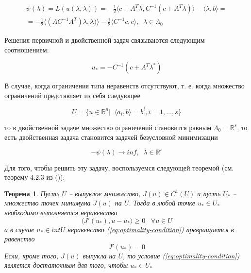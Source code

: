\documentclass[a4paper, 12pt, titlepage]{article}
\theoremstyle{definition}
\theoremstyle{plain}
\newtheorem{SmartTheorem}{Теорема}
\theoremstyle{plain}
\begin{document}
\begin{equation}
 \begin{aligned}
  \psi(\lambda) = L(u(\lambda, \lambda)) =
  - \frac{1}{2} \langle c + A^{T} \lambda, C^{-1} (c + A^{T} \lambda) \rangle -
  \langle \lambda, b \rangle = \\
  = - \frac{1}{2} \langle (A C^{-1} A^{T}) \lambda, \lambda) \rangle
  - \frac{1}{2} \langle C^{-1} c, c \rangle, \;\; \lambda \in \Lambda_{0}
 \end{aligned}
\end{equation}

Решения первичной и двойственной задач связываются следующим соотношением:

\begin{equation}
 u_{*} = - C^{-1} (c + A^{T} \lambda^{*})
\end{equation}


В случае, когда ограничения типа неравенств отсутствуют, т. е. когда множество
ограничений представляет из себя следующее

\begin{equation}
 U = \{u \in \mathbb{R}^{n} | \;\; \langle a_{i}, b \rangle = b^{i},
 i = 1, \ldots, s\}
\end{equation}

то в двойственной задаче множество ограничений становится равным $\Lambda_{0} = 
\mathbb{R}^{s}$, то есть двойственная задача становится задачей безусловной 
минимизации

\begin{equation}
 - \psi (\lambda) \to inf, \;\; \lambda \in \mathbb{R}^{s}
\end{equation}

Для того, чтобы решить эту задачу, воспользуемся следующей теоремой (см. 
теорему 4.2.3 из (\cite{Vasilev1980})):

\begin{SmartTheorem}
 Пусть $U$ -- выпуклое множество, $J(u) \in C^{1}(U)$ и пусть $U_{*}$ --
 множество точек минимума $J(u)$ на $U$. Тогда в любой точке $u_{*} \in U_{*}$
 необходимо выполняется неравенство
 \begin{equation}
 \label{eq:optimality-condition}
  \langle J'(u_{*}), u - u_{*} \rangle \geq 0 \;\;\; \forall u \in U
 \end{equation}
 а в случае $u_{*} \in int U$ неравенство (\ref{eq:optimality-condition})
 превращается в равенство
 \begin{equation}
  J'(u_{*}) = 0
 \end{equation}
 Если, кроме того, $J(u)$ выпукла на $U$, то условие
 (\ref{eq:optimality-condition}) является достаточным для того, чтобы
 $u_{*} \in U_{*}$
\end{SmartTheorem}
\end{document}
